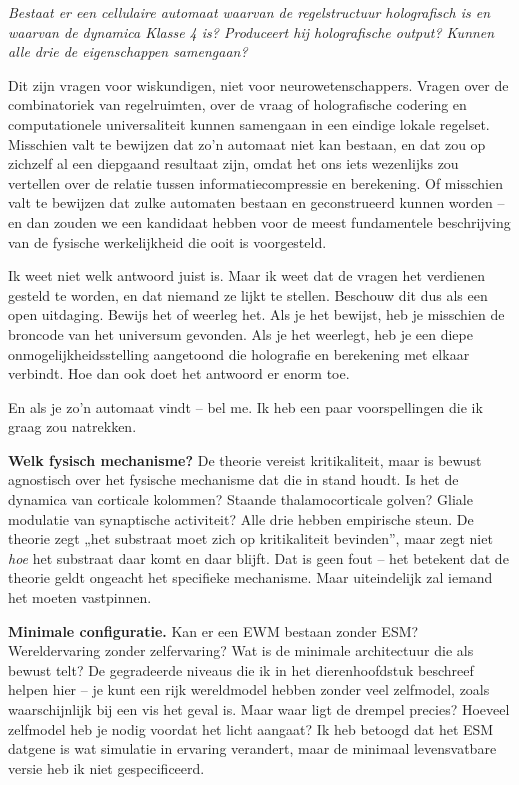 \documentclass[11pt, twoside, openright]{book}
\begin{document}
\textit{Bestaat er een cellulaire automaat waarvan de regelstructuur holografisch is en waarvan de dynamica Klasse 4 is? Produceert hij holografische output? Kunnen alle drie de eigenschappen samengaan?}

Dit zijn vragen voor wiskundigen, niet voor neurowetenschappers. Vragen over de combinatoriek van regelruimten, over de vraag of holografische codering en computationele universaliteit kunnen samengaan in een eindige lokale regelset. Misschien valt te bewijzen dat zo'n automaat niet kan bestaan, en dat zou op zichzelf al een diepgaand resultaat zijn, omdat het ons iets wezenlijks zou vertellen over de relatie tussen informatiecompressie en berekening. Of misschien valt te bewijzen dat zulke automaten bestaan en geconstrueerd kunnen worden -- en dan zouden we een kandidaat hebben voor de meest fundamentele beschrijving van de fysische werkelijkheid die ooit is voorgesteld.

Ik weet niet welk antwoord juist is. Maar ik weet dat de vragen het verdienen gesteld te worden, en dat niemand ze lijkt te stellen. Beschouw dit dus als een open uitdaging. Bewijs het of weerleg het. Als je het bewijst, heb je misschien de broncode van het universum gevonden. Als je het weerlegt, heb je een diepe onmogelijkheidsstelling aangetoond die holografie en berekening met elkaar verbindt. Hoe dan ook doet het antwoord er enorm toe.

En als je zo'n automaat vindt -- bel me. Ik heb een paar voorspellingen die ik graag zou natrekken.

\textbf{Welk fysisch mechanisme?} De theorie vereist kritikaliteit, maar is bewust agnostisch over het fysische mechanisme dat die in stand houdt. Is het de dynamica van corticale kolommen? Staande thalamocorticale golven? Gliale modulatie van synaptische activiteit? Alle drie hebben empirische steun. De theorie zegt „het substraat moet zich op kritikaliteit bevinden”, maar zegt niet \textit{hoe} het substraat daar komt en daar blijft. Dat is geen fout -- het betekent dat de theorie geldt ongeacht het specifieke mechanisme. Maar uiteindelijk zal iemand het moeten vastpinnen.

\textbf{Minimale configuratie.} Kan er een EWM bestaan zonder ESM? Wereldervaring zonder zelfervaring? Wat is de minimale architectuur die als bewust telt? De gegradeerde niveaus die ik in het dierenhoofdstuk beschreef helpen hier -- je kunt een rijk wereldmodel hebben zonder veel zelfmodel, zoals waarschijnlijk bij een vis het geval is. Maar waar ligt de drempel precies? Hoeveel zelfmodel heb je nodig voordat het licht aangaat? Ik heb betoogd dat het ESM datgene is wat simulatie in ervaring verandert, maar de minimaal levensvatbare versie heb ik niet gespecificeerd.
\end{document}
